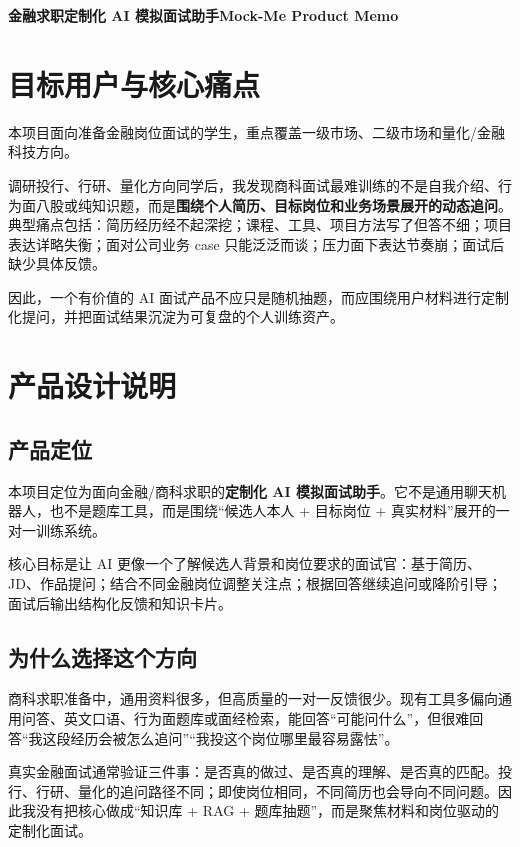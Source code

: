 \documentclass[10pt,a4paper]{ctexart}
\begin{document}
\thispagestyle{empty}

\begin{center}
{\LARGE \textbf{金融求职定制化 AI 模拟面试助手Mock-Me Product Memo}}
\end{center}

\section{目标用户与核心痛点}

本项目面向准备金融岗位面试的学生，重点覆盖一级市场、二级市场和量化/金融科技方向。

调研投行、行研、量化方向同学后，我发现商科面试最难训练的不是自我介绍、行为面八股或纯知识题，而是\textbf{围绕个人简历、目标岗位和业务场景展开的动态追问}。典型痛点包括：简历经历经不起深挖；课程、工具、项目方法写了但答不细；项目表达详略失衡；面对公司业务 case 只能泛泛而谈；压力面下表达节奏崩；面试后缺少具体反馈。

因此，一个有价值的 AI 面试产品不应只是随机抽题，而应围绕用户材料进行定制化提问，并把面试结果沉淀为可复盘的个人训练资产。

\section{产品设计说明}

\subsection{产品定位}

本项目定位为面向金融/商科求职的\textbf{定制化 AI 模拟面试助手}。它不是通用聊天机器人，也不是题库工具，而是围绕“候选人本人 + 目标岗位 + 真实材料”展开的一对一训练系统。

核心目标是让 AI 更像一个了解候选人背景和岗位要求的面试官：基于简历、JD、作品提问；结合不同金融岗位调整关注点；根据回答继续追问或降阶引导；面试后输出结构化反馈和知识卡片。

\subsection{为什么选择这个方向}

商科求职准备中，通用资料很多，但高质量的一对一反馈很少。现有工具多偏向通用问答、英文口语、行为面题库或面经检索，能回答“可能问什么”，但很难回答“我这段经历会被怎么追问”“我投这个岗位哪里最容易露怯”。

真实金融面试通常验证三件事：是否真的做过、是否真的理解、是否真的匹配。投行、行研、量化的追问路径不同；即使岗位相同，不同简历也会导向不同问题。因此我没有把核心做成“知识库 + RAG + 题库抽题”，而是聚焦材料和岗位驱动的定制化面试。
\end{document}
